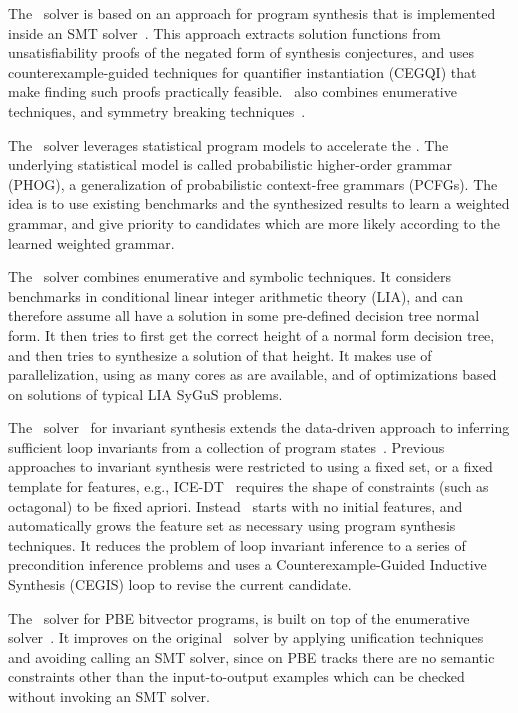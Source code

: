  The \cvcnew\ solver is based on an approach for program synthesis that is implemented inside an SMT solver~\cite{ReynoldsDKTB15}. This approach extracts solution functions from unsatisfiability proofs of the negated form of synthesis conjectures, and uses  counterexample-guided techniques for quantifier instantiation (CEGQI) that make finding such proofs practically feasible. \cvcnew\ also combines enumerative techniques, and symmetry breaking techniques~\cite{ReynoldsT17}. 
 
 The \euphony\ solver leverages statistical program models to accelerate the \eusolver. The underlying statistical model is called probabilistic higher-order grammar (PHOG), a generalization of probabilistic context-free grammars (PCFGs). The idea is to use existing benchmarks and the synthesized results to learn a weighted grammar, and give priority to candidates which are more likely according to the learned weighted grammar.

 The \dryd\ solver combines enumerative and symbolic techniques. It considers benchmarks in conditional linear integer arithmetic theory (LIA), and can therefore assume all have a solution in some pre-defined decision tree normal form. It then tries to first get the correct height of a normal form decision tree, and then tries to synthesize a solution of that height. It makes use of parallelization, using as many cores as are available, and of optimizations based on solutions of typical LIA SyGuS problems.  
 
 The \lig\ solver~\cite{PadhiM17} for invariant synthesis extends the data-driven approach to inferring sufficient loop invariants from a collection of program states~\cite{PadhiSM16}. Previous approaches to invariant synthesis were restricted to using a fixed set, or a fixed template for features, e.g., ICE-DT~\cite{ICEDT,GNMR16} requires the shape of constraints (such as octagonal) to be fixed apriori. Instead \lig\, starts with no initial features, and automatically grows the feature set as necessary using program synthesis techniques. It reduces the problem of loop invariant inference to a series of precondition inference problems and uses a Counterexample-Guided Inductive Synthesis (CEGIS) loop to revise the current candidate.
 
 The \ethree\ solver for PBE bitvector programs, is built on top of the enumerative solver~\cite{AlurBJMRSSSTU13,UdupaRDMMA13}. It improves on the original \enum\ solver by applying unification techniques~\cite{AlurCAV15} and avoiding calling an SMT solver, since on PBE tracks there are no semantic constraints other than the input-to-output examples which can be checked without invoking an SMT solver.
